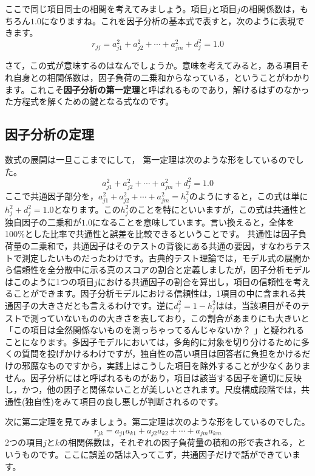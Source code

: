 \documentclass{ltjsbook}
\begin{document}
ここで同じ項目同士の相関を考えてみましょう。項目$j$と項目$j$の相関係数は，もちろん$1.0$になりますね。これを因子分析の基本式で表すと，次のように表現できます。
\begin{equation}
\label{facteo1}
r_{jj}=a_{j1}^2+a_{j2}^2+ \cdots + a_{jm}^2 + d_j^2 = 1.0
\end{equation}

さて，この式が意味するのはなんでしょうか。意味を考えてみると，ある項目それ自身との相関係数は，因子負荷の二乗和からなっている，ということがわかります。これこそ\textbf{因子分析の第一定理}と呼ばれるものであり，解けるはずのなかった方程式を解くための鍵となる式なのです。

\subsection{因子分析の定理}
数式の展開は一旦ここまでにして，
第一定理は次のような形をしているのでした。
\[a_{j1}^2+a_{j2}^2+ \cdots + a_{jm}^2 + d_j^2 = 1.0 \]
ここで共通因子部分を，$a_{j1}^2+a_{j2}^2+ \cdots + a_{jm}^2=h_j^2$のようにすると，この式は単に$h_j^2 + d_j^2 = 1.0$となります。この$h_j^2$のことを特にといいますが，この式は共通性と独自因子の二乗和が$1.0$になることを意味しています。言い換えると，全体を100\%とした比率で共通性と誤差を比較できるということです。
共通性は因子負荷量の二乗和で，共通因子はそのテストの背後にある共通の要因，すなわちテストで測定したいものだったわけです。古典的テスト理論では，モデル式の展開から信頼性を全分散中に示る真のスコアの割合と定義しましたが，因子分析モデルはこのように1つの項目$j$における共通因子の割合を算出し，項目の信頼性を考えることができます。因子分析モデルにおける信頼性は，1項目の中に含まれる共通因子の大きさだとも言えるわけです。逆に$d_j^2=1-h_j^2$はは，当該項目がそのテストで測っていないものの大きさを表しており，この割合があまりにも大きいと「この項目は全然関係ないものを測っちゃってるんじゃないか？ 」と疑われることになります。多因子モデルにおいては，多角的に対象を切り分けるために多くの質問を投げかけるわけですが，独自性の高い項目は回答者に負担をかけるだけの邪魔なものですから，実践上はこうした項目を除外することが少なくありません。因子分析にはと呼ばれるものがあり，項目は該当する因子を適切に反映し，かつ，他の因子と関係ないことが美しいとされます。尺度構成段階では，共通性(独自性)をみて項目の良し悪しが判断されるのです。

次に第二定理を見てみましょう。第二定理は次のような形をしているのでした。
\[  r_{jk}=a_{j1}a_{k1}+a_{j2}a_{k2}+ \cdots +a_{jm}a_{km} \]
2つの項目$j$と$k$の相関係数は，それぞれの因子負荷量の積和の形で表される，というものです。ここに誤差の話は入ってこず，共通因子だけで話ができています。
\end{document}
